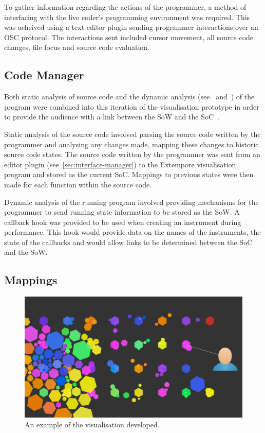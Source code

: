 To gather information regarding the actions of the programmer, a method of interfacing with the live coder's programming environment was required. This was acheived using a text editor plugin sending programmer interactions over an \ac{OSC} protocol. The interactions sent included cursor movement, all source code changes, file focus and source code evaluation.

\subsection{Code Manager}

Both static analysis of source code and the dynamic analysis (see~\cite{Eisenbarth2003} and~\cite{Jerding1997}) of the program were combined into this iteration of the visualisation prototype in order to provide the audience with a link between the \acf{SoW} and the \acf{SoC}~\cite{Swift2013}.

Static analysis of the source code involved parsing the source code written by the programmer and analysing any changes made, mapping these changes to historic source code states. The source code written by the programmer was sent from an editor plugin (see~\ref{sec:interface-manager}) to the Extempore visualisation program and stored as the current \ac{SoC}. Mappings to previous states were then made for each function within the source code.

Dynamic analysis of the running program involved providing mechanisms for the programmer to send running state information to be stored as the \ac{SoW}. A callback hook was provided to be used when creating an instrument during performance. This hook would provide data on the names of the instruments, the state of the callbacks and would allow links to be determined between the \ac{SoC} and the \ac{SoW}.

\subsection{Mappings}

\begin{figure}
\centering
\includegraphics[width=\textwidth]{../images/final-visualisations/final-code-visualisation.png}
\caption[Prototype (second iteration) example]{An example of the visualisation developed.}
\label{fig:final-visualisation}
\end{figure}

